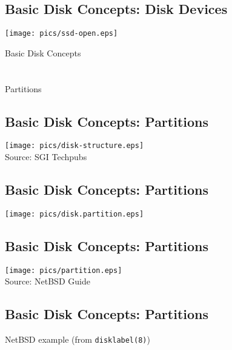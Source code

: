 \documentclass[xga]{xdvislides}
\begin{document}
\subsection{Basic Disk Concepts: Disk Devices}
\begin{center}
	\texttt{[image: pics/ssd-open.eps]} \\
\end{center}


\newpage
\vspace*{\fill}
\begin{center}
	\Hugesize
		Basic Disk Concepts\\ [1em]
	\hspace*{5mm}
	\blueline\\
	\hspace*{5mm}\\
		Partitions
\end{center}
\vspace*{\fill}

\subsection{Basic Disk Concepts: Partitions}
	\begin{center}
		\texttt{[image: pics/disk-structure.eps]} \\
		\tiny Source: SGI Techpubs \\
	\end{center}

\subsection{Basic Disk Concepts: Partitions}
	\begin{center}
		\texttt{[image: pics/disk.partition.eps]}
	\end{center}


\subsection{Basic Disk Concepts: Partitions}
	\begin{center}
		\texttt{[image: pics/partition.eps]} \\
		\tiny Source: NetBSD Guide \\
	\end{center}

\subsection{Basic Disk Concepts: Partitions}
NetBSD example (from {\tt disklabel(8)})
\end{document}
